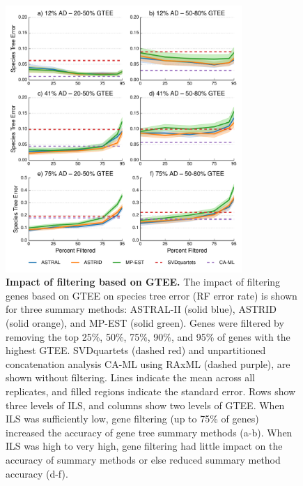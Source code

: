 \begin{figure}[!h]
\centering
\includegraphics[width=0.80\textwidth]{figures/gene-filtering-fig3.pdf}
\caption{{\bf Impact of filtering based on GTEE.} The impact of filtering genes based on GTEE on species tree error (RF error rate) is shown for three summary methods: ASTRAL-II (solid blue), ASTRID (solid orange), and MP-EST (solid green). 
Genes were filtered by removing the top 25\%, 50\%, 75\%, 90\%, and 95\% of genes with the highest GTEE. 
SVDquartets (dashed red) and unpartitioned concatenation analysis CA-ML using RAxML (dashed purple), are shown without filtering. 
Lines indicate the mean across all replicates, and filled regions indicate the standard error. 
Rows show three levels of ILS, and  columns show two levels of GTEE. 
When ILS was sufficiently low, gene filtering (up to 75\% of genes) increased the accuracy of gene tree summary methods (a-b). When ILS was high to very high, gene filtering had little impact on the accuracy of summary methods or else reduced summary method accuracy (d-f).}
\label{fig:include-3}
\end{figure}

\afterpage{\clearpage}

